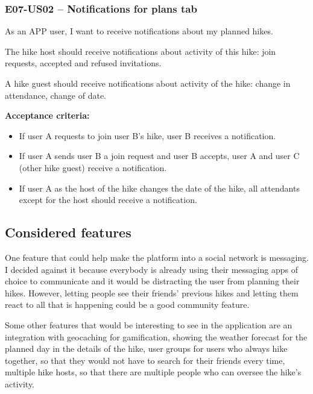 \subsubsection*{E07-US02 -- Notifications for plans tab}
As an APP user, I want to receive notifications about my planned hikes.

The hike host should receive notifications about activity of this hike: join requests, accepted and refused invitations.

A hike guest should receive notifications about activity of the hike: change in attendance, change of date.

\textbf{Acceptance criteria:}
\begin{itemize}
    \item If user A requests to join user B's hike, user B receives a notification.
    \item If user A sends user B a join request and user B accepts, user A and user C (other hike guest) receive a notification.
    \item If user A as the host of the hike changes the date of the hike, all attendants except for the host should receive a notification.
\end{itemize}


\subsection*{Considered features}
One feature that could help make the platform into a social network is messaging.
I decided against it because everybody is already using their messaging apps of choice to communicate and it would be distracting the user from planning their hikes.
However, letting people see their friends' previous hikes and letting them react to all that is happening could be a good community feature.

Some other features that would be interesting to see in the application are an integration with geocaching\cite{geocaching} for gamification,
showing the weather forecast for the planned day in the details of the hike,
user groups for users who always hike together, so that they would not have to search for their friends every time,
multiple hike hosts, so that there are multiple people who can oversee the hike's activity.
